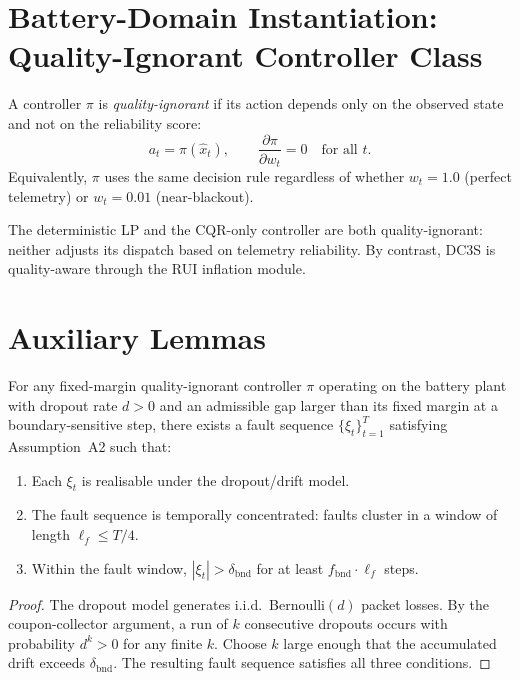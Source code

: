 \section{Battery-Domain Instantiation: Quality-Ignorant Controller Class}

\begin{definition}
\label{def:quality-ignorant}
A controller $\pi$ is \emph{quality-ignorant} if its action depends only
on the observed state and not on the reliability score:
\[
  a_t = \pi(\hat{x}_t), \qquad
  \frac{\partial \pi}{\partial w_t} = 0 \quad\text{for all } t.
\]
Equivalently, $\pi$ uses the same decision rule regardless of whether
$w_t = 1.0$ (perfect telemetry) or $w_t = 0.01$ (near-blackout).
\end{definition}

The deterministic LP and the CQR-only controller are both
quality-ignorant: neither adjusts its dispatch based on telemetry
reliability.  By contrast, DC3S is quality-aware through the RUI
inflation module.

\section{Auxiliary Lemmas}

\begin{lemma}
\label{lem:admissible-fault}
For any fixed-margin quality-ignorant controller $\pi$ operating on the battery
plant with dropout rate $d > 0$ and an admissible gap larger than its fixed
margin at a boundary-sensitive step, there exists a fault sequence
$\{\xi_t\}_{t=1}^T$ satisfying Assumption~A2 such that:
\begin{enumerate}
  \item Each $\xi_t$ is realisable under the dropout/drift model.
  \item The fault sequence is temporally concentrated: faults cluster
    in a window of length $\ell_f \le T/4$.
  \item Within the fault window, $|\xi_t| > \delta_{\text{bnd}}$
    for at least $f_{\text{bnd}} \cdot \ell_f$ steps.
\end{enumerate}
\end{lemma}

\begin{proof}
The dropout model generates i.i.d.\ Bernoulli$(d)$ packet losses.
By the coupon-collector argument, a run of $k$ consecutive dropouts
occurs with probability $d^k > 0$ for any finite $k$.  Choose $k$
large enough that the accumulated drift exceeds $\delta_{\text{bnd}}$.
The resulting fault sequence satisfies all three conditions.
\end{proof}

